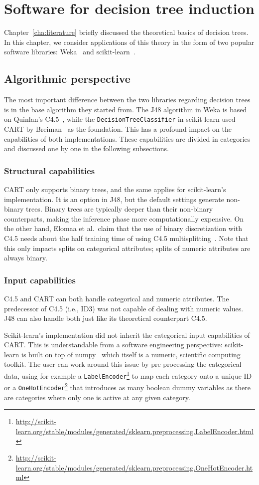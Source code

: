 \chapter{Software for decision tree induction}\label{cha:software}
Chapter~\ref{cha:literature} briefly discussed the theoretical basics of decision trees. In this chapter, we consider applications of this theory in the form of two popular software libraries: Weka~\cite{eibe2016weka} and scikit-learn~\cite{scikit-learn}.

\section{Algorithmic perspective}
The most important difference between the two libraries regarding decision trees is in the base algorithm they started from. The J48 algorithm in Weka is based on Quinlan's C4.5~\cite{c45}, while the \texttt{DecisionTreeClassifier} in scikit-learn used CART by Breiman~\cite{cart} as the foundation. This has a profound impact on the capabilities of both implementations. These capabilities are divided in categories and discussed one by one in the following subsections.

\subsection{Structural capabilities}
CART only supports binary trees, and the same applies for scikit-learn's implementation. It is an option in J48, but the default settings generate non-binary trees. Binary trees are typically deeper than their non-binary counterparts, making the inference phase more computationally expensive. On the other hand, Elomaa et al.\ claim that the use of binary discretization with C4.5 needs about the half training time of using C4.5 multisplitting~\cite{elomaa1999general}. Note that this only impacts splits on categorical attributes; splits of numeric attributes are always binary.

\subsection{Input capabilities}
C4.5 and CART can both handle categorical and numeric attributes. The predecessor of C4.5 (i.e., ID3) was not capable of dealing with numeric values. J48 can also handle both just like its theoretical counterpart C4.5.

Scikit-learn's implementation did not inherit the categorical input capabilities of CART. This is understandable from a software engineering perspective: scikit-learn is built on top of numpy~\cite{numpy} which itself is a numeric, scientific computing toolkit. The user can work around this issue by pre-processing the categorical data, using for example a \texttt{LabelEncoder}\footnote{\url{http://scikit-learn.org/stable/modules/generated/sklearn.preprocessing.LabelEncoder.html}} to map each category onto a unique ID or a \texttt{OneHotEncoder}\footnote{\url{http://scikit-learn.org/stable/modules/generated/sklearn.preprocessing.OneHotEncoder.html}} that introduces as many boolean dummy variables as there are categories where only one is active at any given category.

